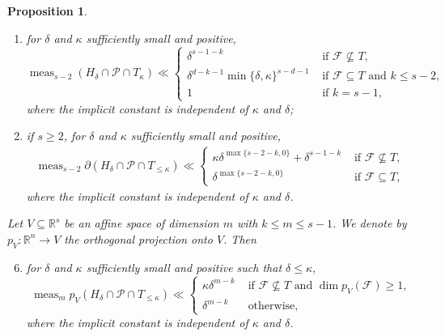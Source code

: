 \documentclass[11pt]{article}
\numberwithin{equation}{section}
\newenvironment{enumeratei}
{\bgroup\def\theenumi{\roman{enumi}}\def\theenumii{\arabic{enumii}}\begin{enumerate}}
{\end{enumerate}\egroup}
\let\del\delta
\newcommand{\calP}{\mathcal{P}}
\newcommand\RR{\mathbb{R}}
\DeclareMathOperator{\meas}{meas}
\newtheorem{prop}[theorem]{Proposition}
\theoremstyle{definition}
\numberwithin{theorem}{section}
\begin{document}
\begin{prop}
\begin{enumeratei}
\[\meas_{s-1} (H_\delta \cap \mathcal P \cap T_{\leq \kappa}) \ll \begin{cases}
\kappa \delta^{s-1-k} & \text{ if } \mathcal F\not\subseteq T,\\
\min\{\kappa,\delta\} \delta^{s-2-k} & \text{ if } \mathcal F\subseteq T,
\end{cases}
\]
where the implicit constant is independent of $\kappa$ and $\delta$;
\item
\label{item:volume_s-2_delta_kappa}
for $\delta$ and $\kappa$ sufficiently small and positive,
\[
\meas_{s-2} (H_\delta \cap \mathcal P \cap T_{\kappa}) \ll \begin{cases}
\delta^{s-1-k} & \text{ if } \mathcal F\not\subseteq T,\\
\delta^{d-k-1}\min\{\delta,\kappa\}^{s-d-1} & \text{ if } \mathcal F\subseteq T \text{ and } k\leq s-2,\\
1 & \text{ if } k=s-1,
\end{cases}
\]
where the implicit constant is independent of $\kappa$ and $\delta$;
\item
\label{item:volume_boundary_kappa}
if $s\geq 2$, for $\delta$ and $\kappa$ sufficiently small and positive,
\begin{gather*}
\meas_{s-2} \partial (H_{\del}\cap \calP\cap T_{\leq\kappa})
\ll\begin{cases}
\kappa \del^{\max\{s-2-k,0\}} + \del^{s-1-k} & \text{ if } \mathcal F\not\subseteq T, \\
\delta^{\max\{s-2-k, 0\}} & \text{ if } \mathcal F\subseteq T,
\end{cases}
\end{gather*}
where the implicit constant is independent of $\kappa$ and $\delta$.
\end{enumeratei}
Let $V\subseteq\RR^s$ be an affine space of dimension $m$ with $k\leq m\leq s-1$. We denote by $p_V:\RR^n\to V$ the orthogonal projection onto $V$. Then
\begin{enumeratei}\setcounter{enumi}{5}
\item
\label{item:volume_proj}
for $\delta$ and $\kappa$ sufficiently small and positive such that $\delta\leq\kappa$,
\begin{equation*}
\meas_mp_V(H_\delta\cap\mathcal P\cap T_{\leq \kappa})
\ll \begin{cases}
\kappa \delta^{m-k} & \text{ if $\mathcal F\nsubseteq T$ and $\dim p_V(\mathcal F)\geq 1$,}\\
\delta^{m-k} & \text{ otherwise,}
\end{cases}
\end{equation*}
where the implicit constant is independent of $\kappa$ and $\delta$.
\end{enumeratei}
\end{prop}
\end{document}
